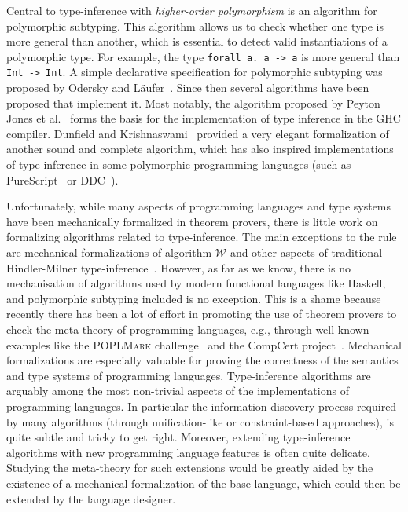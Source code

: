 Central to type-inference with \emph{higher-order polymorphism} is an
algorithm for polymorphic subtyping. 
This algorithm
allows us to check whether one type is more general than another,
which is essential to detect valid instantiations of a polymorphic
type. For example, the type \verb|forall a. a -> a| is more
general than \verb|Int -> Int|. 
A simple declarative specification for polymorphic subtyping
was proposed by Odersky and L\"aufer~\cite{odersky1996putting}. Since then several
algorithms have been proposed that implement it. Most
notably, the algorithm proposed by Peyton Jones et al.~\cite{jones2007practical} forms the basis
for the implementation of type inference in the GHC compiler. 
Dunfield and Krishnaswami~\cite{dunfield2013complete} provided a very elegant
formalization of another sound and complete algorithm, which has 
also inspired implementations of type-inference in some polymorphic 
programming languages (such as PureScript~\cite{PureScript} or DDC~\cite{Disciple}).

Unfortunately, while many aspects of programming languages and type systems
have been mechanically formalized in theorem provers, there is little work on
formalizing algorithms related to type-inference. The main exceptions to the rule
are mechanical formalizations of algorithm $\mathcal{W}$ and other aspects
of traditional Hindler-Milner 
type-inference~\cite{naraschewski1999type,dubois2000proving,dubois1999certification,urban2008nominal,garrigue2015certified}.
However, as far as we know, there is no mechanisation of algorithms 
used by modern functional languages like Haskell, and
polymorphic subtyping included is no exception.  
This is a shame because recently there has been a lot of effort
in promoting the use of theorem provers to check the meta-theory 
of programming languages, e.g., through well-known examples like the \textsc{POPLMark} challenge~\cite{aydemir2005mechanized} and the CompCert project~\cite{leroy2012compcert}.
Mechanical formalizations are especially valuable for proving the
correctness of the semantics and type systems 
of programming languages. Type-inference algorithms are arguably among
the most non-trivial aspects of the implementations of programming
languages. In particular the information discovery process required by 
many algorithms (through unification-like or constraint-based
approaches), is quite subtle and tricky to get right. Moreover,
extending type-inference algorithms with new programming language features is often quite 
delicate. Studying the meta-theory for such extensions would be
greatly aided by the existence of a mechanical
formalization of the base language, which could then be extended by
the language designer.

